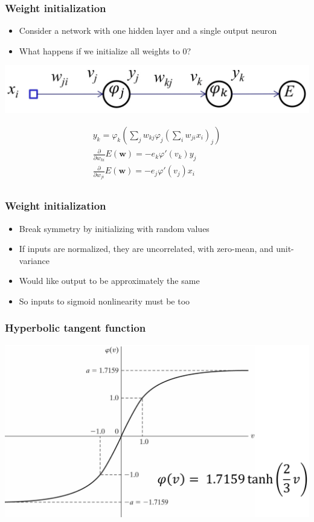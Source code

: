 \documentclass[12pt,notes,mathserif]{beamer}
\begin{document}
\begin{frame}[c]
	\frametitle{Weight initialization}
	\begin{itemize}
		\item Consider a network with one hidden layer and a single output neuron
		\item What happens if we initialize all weights to 0?
	\end{itemize}
	\begin{center}
		\includegraphics[width=0.47\linewidth]{fig/lec66.jpg}
	\end{center}
	\[
		\begin{array}{c}
			y_k=\varphi_k\left(\sum\nolimits_jw_{kj}\varphi_j\left(\sum\nolimits_iw_{ji}x_i\right)_j\right) \\
			\frac{\partial}{\partial w_{ki}}E(\mathbf{w})=-e_k\varphi'(v_k)y_j                            \\
			\frac{\partial}{\partial w_{ji}}E(\mathbf{w})=-e_j\varphi'(v_j)x_i                            \\
		\end{array}
	\]
\end{frame}
\begin{frame}[c]
	\frametitle{Weight initialization}
	\begin{itemize}
		\item Break symmetry by initializing with random values
		\item If inputs are normalized, they are uncorrelated, with zero-mean, and unit-variance

		\item Would like output to be approximately the same

		\item So inputs to sigmoid nonlinearity must be too

	\end{itemize}
\end{frame}

\begin{frame}[c]
	\frametitle{Hyperbolic tangent function}
	\begin{center}
		\includegraphics[width=0.95\linewidth]{fig/lec68.jpg}
	\end{center}
\end{frame}
\end{document}
